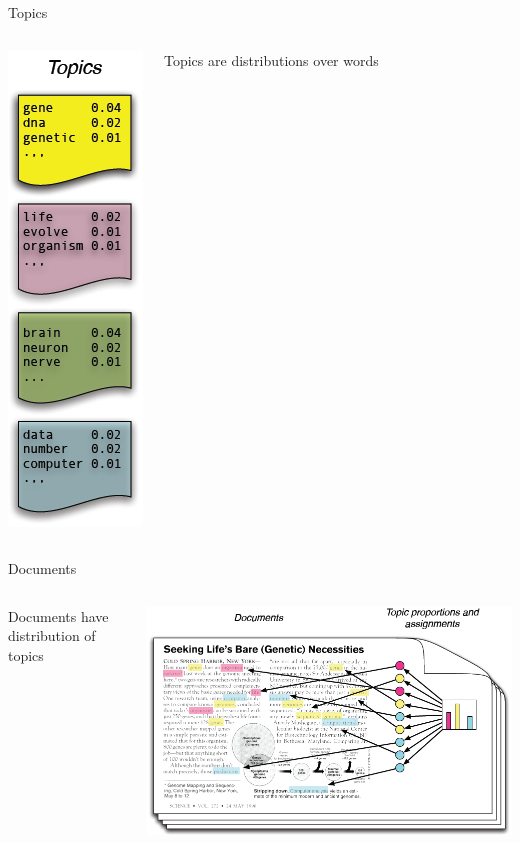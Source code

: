 \documentclass{lecture}
\begin{document}
\begin{plain}{Topics}
\begin{columns}
\begin{center}
\includegraphics[scale=0.4]{figs/blei_topics}
\end{center}
\begin{center}
Topics are distributions over words
\end{center}
\end{columns}
\end{plain}

\begin{plain}{Documents}
\begin{columns}
\begin{center}
Documents have distribution of topics
\end{center}
\begin{center}
\includegraphics[scale=0.3]{figs/blei_docs}
\end{center}
\end{columns}
\end{plain}
\end{document}
